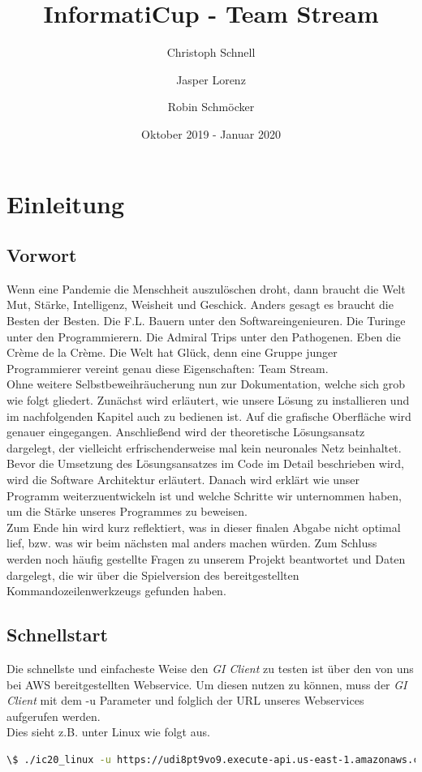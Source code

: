 \documentclass{article}
\title{InformatiCup - Team Stream}
\author{Christoph Schnell \and Jasper Lorenz \and Robin Schmöcker}
\date{Oktober 2019 - Januar 2020}
\newcommand{\gquote}[1]{\glqq #1\grqq} %
\let\oldgls\gls
\renewcommand{\gls}[1]{\emph{\oldgls{#1}}} %
\begin{document}
\maketitle
\tableofcontents

\newpage
\section{Einleitung}
\subsection{Vorwort}
Wenn eine Pandemie die Menschheit auszulöschen droht, dann braucht die Welt Mut, Stärke, Intelligenz, Weisheit und Geschick. Anders gesagt es braucht die Besten der Besten. Die F.L. Bauern unter den Softwareingenieuren. Die Turinge unter den Programmierern. Die Admiral Trips unter den Pathogenen. Eben die \gquote{Crème de la Crème}. Die Welt hat Glück, denn eine Gruppe junger Programmierer vereint genau diese Eigenschaften: Team Stream. \\
Ohne weitere Selbstbeweihräucherung nun zur Dokumentation, welche sich grob wie folgt gliedert. Zunächst wird erläutert, wie unsere Lösung zu installieren und im nachfolgenden Kapitel auch zu bedienen ist. Auf die grafische Oberfläche wird genauer eingegangen. Anschließend wird der theoretische Lösungsansatz dargelegt, der vielleicht erfrischenderweise mal kein neuronales Netz beinhaltet. Bevor die Umsetzung des Lösungsansatzes im Code im Detail beschrieben wird, wird die Software Architektur erläutert. Danach wird erklärt wie unser Programm weiterzuentwickeln ist und welche Schritte wir unternommen haben, um die Stärke unseres Programmes zu beweisen. \\
Zum Ende hin wird kurz reflektiert, was in dieser finalen Abgabe nicht optimal lief, bzw. was wir beim nächsten mal anders  machen würden. Zum Schluss werden noch häufig gestellte Fragen zu unserem Projekt beantwortet und Daten dargelegt, die wir über die Spielversion des bereitgestellten Kommandozeilenwerkzeugs gefunden haben.

\subsection{Schnellstart}
\label{sec:Schnellstart}
Die schnellste und einfacheste Weise den \gls{GI Client} zu testen ist über den von uns bei AWS bereitgestellten Webservice. Um diesen nutzen zu können, muss der \gls{GI Client} mit dem \gquote{-u} Parameter und folglich der URL unseres Webservices aufgerufen werden. \\
Dies sieht z.B. unter Linux wie folgt aus.
\begin{lstlisting}[language=bash, basicstyle=\footnotesize, numbers=none]
\$ ./ic20_linux -u https://udi8pt9vo9.execute-api.us-east-1.amazonaws.com/default/
\end{lstlisting}
\newpage
\end{document}
